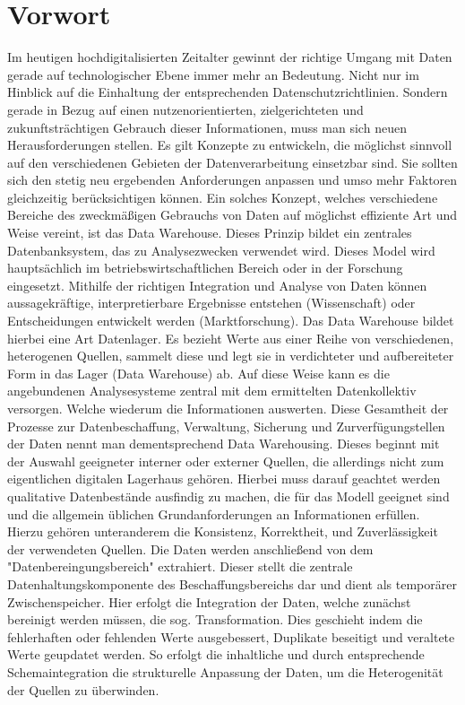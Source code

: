 \section{Vorwort}
Im heutigen hochdigitalisierten Zeitalter gewinnt der richtige Umgang mit Daten gerade auf technologischer Ebene immer mehr an Bedeutung. Nicht nur im Hinblick auf die Einhaltung der entsprechenden Datenschutzrichtlinien. Sondern gerade in Bezug auf einen nutzenorientierten, zielgerichteten und zukunftsträchtigen Gebrauch dieser Informationen, muss man sich neuen Herausforderungen stellen. Es gilt Konzepte zu entwickeln, die möglichst sinnvoll auf den verschiedenen Gebieten der Datenverarbeitung einsetzbar sind. Sie sollten sich den stetig neu ergebenden Anforderungen anpassen und umso mehr Faktoren gleichzeitig berücksichtigen können. Ein solches Konzept, welches verschiedene Bereiche des zweckmäßigen Gebrauchs von Daten auf möglichst effiziente Art und Weise vereint, ist das Data Warehouse. Dieses Prinzip bildet ein zentrales Datenbanksystem, das zu Analysezwecken verwendet wird. 
Dieses Model wird hauptsächlich im betriebswirtschaftlichen Bereich oder in der Forschung eingesetzt.  Mithilfe der richtigen Integration und Analyse von Daten können aussagekräftige, interpretierbare Ergebnisse entstehen (Wissenschaft) oder Entscheidungen entwickelt werden (Marktforschung). 
Das Data Warehouse bildet hierbei eine Art Datenlager. Es bezieht Werte aus einer Reihe von verschiedenen, heterogenen Quellen, sammelt diese und legt sie in verdichteter und aufbereiteter Form in das Lager (Data Warehouse) ab. Auf diese Weise kann es die angebundenen Analysesysteme zentral mit dem ermittelten Datenkollektiv versorgen. Welche wiederum die Informationen auswerten.  Diese Gesamtheit der Prozesse zur Datenbeschaffung, Verwaltung, Sicherung und Zurverfügungstellen der Daten nennt man dementsprechend Data Warehousing. 
Dieses beginnt mit der Auswahl geeigneter interner oder externer Quellen, die allerdings nicht zum eigentlichen digitalen Lagerhaus gehören. Hierbei muss darauf geachtet werden qualitative Datenbestände ausfindig zu machen, die für das Modell geeignet sind und die allgemein üblichen Grundanforderungen an Informationen erfüllen. Hierzu gehören unteranderem die Konsistenz, Korrektheit, und Zuverlässigkeit der verwendeten Quellen. 
Die Daten werden anschließend von dem "Datenbereingungsbereich" extrahiert. Dieser stellt die zentrale Datenhaltungskomponente des Beschaffungsbereichs dar und dient als temporärer Zwischenspeicher. Hier erfolgt die Integration der Daten, welche zunächst bereinigt werden müssen, die sog. Transformation. Dies geschieht indem die fehlerhaften oder fehlenden Werte ausgebessert, Duplikate beseitigt und veraltete Werte geupdatet werden. So erfolgt die inhaltliche und durch entsprechende Schemaintegration die strukturelle Anpassung der Daten, um die Heterogenität der Quellen zu überwinden.  
